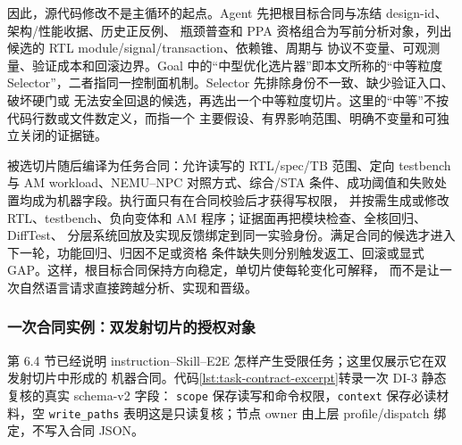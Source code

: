 \documentclass[UTF8,a4paper,zihao=-4,oneside]{ctexart}
\begin{document}
因此，源代码修改不是主循环的起点。Agent 先把根目标合同与冻结 design-id、架构/性能收据、历史正反例、
瓶颈普查和 PPA 资格组合为写前分析对象，列出候选的 RTL module/signal/transaction、依赖锥、周期与
协议不变量、可观测量、验证成本和回滚边界。Goal 中的“中型优化选片器”即本文所称的“中等粒度
Selector”，二者指同一控制面机制。Selector 先排除身份不一致、缺少验证入口、破坏硬门或
无法安全回退的候选，再选出一个中等粒度切片。这里的“中等”不按代码行数或文件数定义，而指一个
主要假设、有界影响范围、明确不变量和可独立关闭的证据链。

被选切片随后编译为任务合同：允许读写的 RTL/spec/TB 范围、定向 testbench 与 AM workload、NEMU--NPC
对照方式、综合/STA 条件、成功阈值和失败处置均成为机器字段。执行面只有在合同校验后才获得写权限，
并按需生成或修改 RTL、testbench、负向变体和 AM 程序；证据面再把模块检查、全核回归、DiffTest、
分层系统回放及实现反馈绑定到同一实验身份。满足合同的候选才进入下一轮，功能回归、归因不足或资格
条件缺失则分别触发返工、回滚或显式 GAP。这样，根目标合同保持方向稳定，单切片使每轮变化可解释，
而不是让一次自然语言请求直接跨越分析、实现和晋级。

\subsubsection{一次合同实例：双发射切片的授权对象}

第 6.4 节已经说明 instruction--Skill--E2E 怎样产生受限任务；这里仅展示它在双发射切片中形成的
机器合同。代码\ref{lst:task-contract-excerpt}转录一次 DI-3 静态复核的真实 schema-v2 字段：
\texttt{scope} 保存读写和命令权限，\texttt{context} 保存必读材料，空
\texttt{write\_paths} 表明这是只读复核；节点 owner 由上层 profile/dispatch 绑定，不写入合同 JSON。
\end{document}
